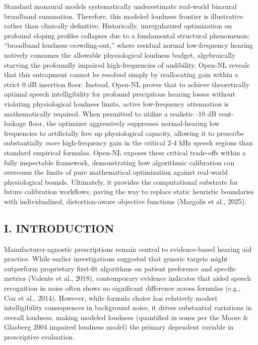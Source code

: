 \documentclass[
  12pt,
]{article}
\begin{document}
Standard monaural models systematically underestimate real-world
binaural broadband summation. Therefore, this modeled loudness frontier
is illustrative rather than clinically definitive. Historically,
unregularized optimization on profound sloping profiles collapses due to
a fundamental structural phenomenon: ``broadband loudness
crowding-out,'' where residual normal low-frequency hearing natively
consumes the allowable physiological loudness budget, algebraically
starving the profoundly impaired high-frequencies of audibility. Open-NL
reveals that this entrapment cannot be resolved simply by reallocating
gain within a strict 0 dB insertion floor. Instead, Open-NL proves that
to achieve theoretically optimal speech intelligibility for profound
precipitous hearing losses without violating physiological loudness
limits, active low-frequency attenuation is mathematically required.
When permitted to utilize a realistic -10 dB vent-leakage floor, the
optimizer aggressively suppresses normal-hearing low frequencies to
artificially free up physiological capacity, allowing it to prescribe
substantially \emph{more} high-frequency gain in the critical 2-4 kHz
speech regions than standard empirical formulas. Open-NL exposes these
critical trade-offs within a fully inspectable framework, demonstrating
how algorithmic calibration can overcome the limits of pure mathematical
optimization against real-world physiological bounds. Ultimately, it
provides the computational substrate for future calibration workflows,
paving the way to replace static heuristic boundaries with
individualized, distortion-aware objective functions (Margolis et al.,
2025).

\subsection{I. INTRODUCTION}\label{i.-introduction}

Manufacturer-agnostic prescriptions remain central to evidence-based
hearing aid practice. While earlier investigations suggested that
generic targets might outperform proprietary first-fit algorithms on
patient preference and specific metrics (Valente et al., 2018),
contemporary evidence indicates that aided speech recognition in noise
often shows no significant difference across formulas (e.g., Cox et al.,
2014). However, while formula choice has relatively modest
intelligibility consequences in background noise, it drives substantial
variations in overall loudness, making modeled loudness (quantified in
sones per the Moore \& Glasberg 2004 impaired loudness model) the
primary dependent variable in prescriptive evaluation.
\end{document}
